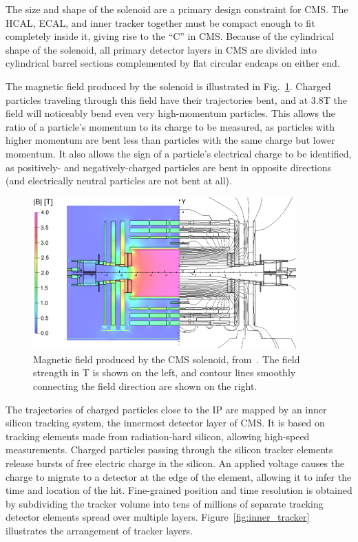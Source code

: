 \documentclass[oneside, letterpaper, 12pt, oldfontcommands]{memoir}
\begin{document}
The size and shape of the solenoid are a primary design constraint for CMS. The HCAL, ECAL, and inner tracker together must be compact
enough to fit completely inside it, giving rise to the ``C'' in CMS. Because of the cylindrical shape of the solenoid,
all primary detector layers in CMS are divided into cylindrical barrel sections complemented by flat circular endcaps on either end.

The magnetic field produced by the solenoid is illustrated in Fig.~\ref{fig:solenoid_field}.
Charged particles traveling through this field have their trajectories bent, and at 3.8\unit{T} the field will noticeably
bend even very high-momentum particles. This allows the ratio of a particle's momentum to its charge to be measured, as particles
with higher momentum are bent less than particles with the same charge but lower momentum. It also allows the sign of a particle's electrical charge
to be identified, as positively- and negatively-charged particles are bent in opposite directions (and electrically neutral
particles are not bent at all).

\begin{figure}[hbtp]
  \begin{center}
    \includegraphics[width=0.90\textwidth]{Figures/solenoid_field.png}
    \caption{
    Magnetic field produced by the CMS solenoid, from~\cite{ref:1748-0221/5/03/T03021}. The field strength in T is shown on the left,
    and contour lines smoothly connecting the field direction are shown on the right.
    }
    \label{fig:solenoid_field}
  \end{center}
\end{figure}

The trajectories of charged particles close to the IP are mapped by an inner silicon tracking system, the innermost detector layer of CMS.
It is based on tracking elements made from radiation-hard silicon, allowing high-speed measurements.
Charged particles passing through the silicon tracker elements release bursts of free electric charge in the silicon. An applied voltage causes
the charge to migrate to a detector at the edge of the element, allowing it to infer the time and location of the hit.
Fine-grained position and time resolution is obtained by subdividing the tracker volume into tens of millions of separate tracking detector elements
spread over multiple layers. Figure~\ref{fig:inner_tracker} illustrates the arrangement of tracker layers.
\end{document}
